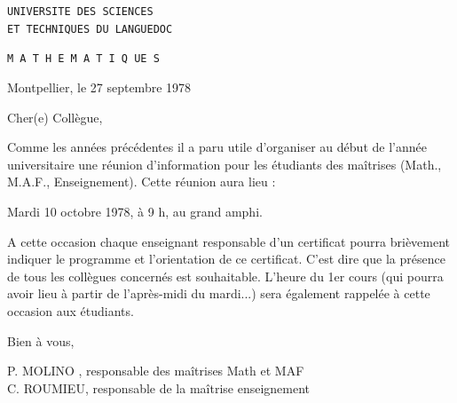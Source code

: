 
\begin{flushleft}
\texttt{UNIVERSITE DES SCIENCES}\\
\texttt{ET TECHNIQUES DU LANGUEDOC}

\texttt{M A T H E M A T I Q UE S}
\end{flushleft}

Montpellier, le 27 septembre 1978

Cher(e) Collègue,

Comme les années précédentes il a paru utile d'organiser au début de l'année universitaire une réunion d'information pour les étudiants des maîtrises (Math., M.A.F., Enseignement). Cette réunion aura lieu :

\begin{center}
Mardi 10 octobre 1978, à 9 h, au grand amphi.
\end{center}

A cette occasion chaque enseignant responsable d'un certificat pourra brièvement indiquer le programme et l'orientation de ce certificat. C'est dire que la présence de tous les collègues concernés est souhaitable. L'heure du 1er cours (qui pourra avoir lieu à partir de l'après-midi du mardi...) sera également rappelée à cette occasion aux étudiants.

Bien à vous,

\begin{flushright}
P. MOLINO , responsable des maîtrises Math et MAF\\
C. ROUMIEU, responsable de la maîtrise enseignement
\end{flushright}

